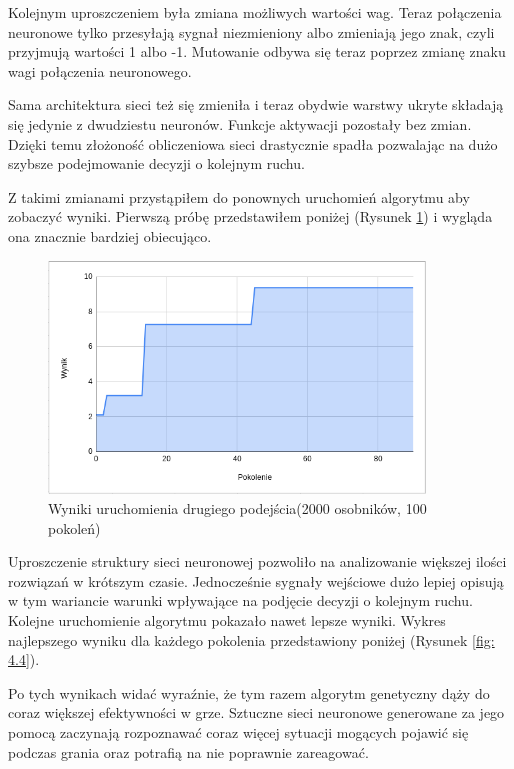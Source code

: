 \documentclass[12pt, oneside, a4paper]{report}
\begin{document}
Kolejnym uproszczeniem była zmiana możliwych wartości wag. Teraz połączenia neuronowe tylko przesyłają sygnał niezmieniony albo zmieniają jego znak, czyli przyjmują wartości 1 albo -1. Mutowanie odbywa się teraz poprzez zmianę znaku wagi połączenia neuronowego.

Sama architektura sieci też się zmieniła i teraz obydwie warstwy ukryte składają się jedynie z dwudziestu neuronów. Funkcje aktywacji pozostały bez zmian. Dzięki temu złożoność obliczeniowa sieci drastycznie spadła pozwalając na dużo szybsze podejmowanie decyzji o kolejnym ruchu.

Z takimi zmianami przystąpiłem do ponownych uruchomień algorytmu aby zobaczyć wyniki. Pierwszą próbę przedstawiłem poniżej (Rysunek \ref{fig: 4.3}) i wygląda ona znacznie bardziej obiecująco.
\newpage

\begin{figure}[h]
	\centering
	\includegraphics[width=10cm]{fig43.png}
	\caption{Wyniki uruchomienia drugiego podejścia(2000 osobników, 100 pokoleń) }
	\label{fig: 4.3}
\end{figure}

Uproszczenie struktury sieci neuronowej pozwoliło na analizowanie większej ilości rozwiązań w krótszym czasie. Jednocześnie sygnały wejściowe dużo lepiej opisują w tym wariancie warunki wpływające na podjęcie decyzji o kolejnym ruchu. Kolejne uruchomienie algorytmu pokazało nawet lepsze wyniki. Wykres najlepszego wyniku dla każdego pokolenia przedstawiony poniżej (Rysunek \ref{fig: 4.4}).

Po tych wynikach widać wyraźnie, że tym razem algorytm genetyczny dąży do coraz większej efektywności w grze. Sztuczne sieci neuronowe generowane za jego pomocą zaczynają rozpoznawać coraz więcej sytuacji mogących pojawić się podczas grania oraz potrafią na nie poprawnie zareagować.
\end{document}
